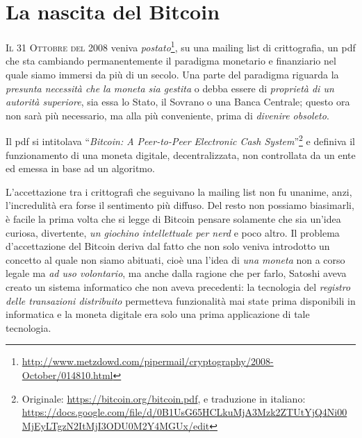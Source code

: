 \documentclass[a4paper,12pt,italian]{article}
\begin{document}
\section*{La nascita del Bitcoin}



\lettrine{I}{l 31 Ottobre del 2008} veniva
\emph{postato}\footnote{\url{http://www.metzdowd.com/pipermail/cryptography/2008-October/014810.html}}, 
su una mailing list di crittografia, un pdf che sta cambiando permanentemente
 il paradigma monetario e finanziario nel quale siamo immersi da più di un secolo. Una parte del paradigma riguarda la \emph{presunta necessità che la moneta
 sia gestita} o debba essere di \emph{proprietà di un
autorità superiore}, sia essa lo Stato, il Sovrano o una Banca Centrale;
questo ora non sarà più necessario, ma alla più conveniente, prima di \emph{divenire obsoleto}.

\smallskip
Il pdf si intitolava “\emph{Bitcoin: A Peer-to-Peer Electronic Cash
System}”\footnote{Originale: \url{https://bitcoin.org/bitcoin.pdf}, e traduzione
in italiano: \url{https://docs.google.com/file/d/0B1UsG65HCLkuMjA3Mzk2ZTUtYjQ4Ni00MjEyLTgzN2ItMjI3ODU0M2Y4MGUx/edit}
} e definiva il funzionamento di una moneta digitale, decentralizzata, non controllata
da un ente ed emessa in base ad un algoritmo.

\smallskip

L’accettazione tra i crittografi che seguivano la mailing list non fu
unanime, anzi, l’incredulità era forse il sentimento più diffuso. Del
resto non possiamo biasimarli, è facile la prima volta che si legge di
Bitcoin pensare solamente che sia un’idea curiosa, divertente, \emph{un
giochino intellettuale per nerd} e poco altro. Il problema
d’accettazione del Bitcoin deriva dal fatto che non solo veniva
introdotto un concetto al quale non siamo abituati, cioè una l’idea di
\emph{una moneta} non a corso legale ma \emph{ad uso volontario}, ma anche dalla
ragione che per farlo, Satoshi aveva creato un sistema informatico che
non aveva precedenti: la tecnologia del \emph{registro delle transazioni
distribuito} permetteva funzionalità mai state prima disponibili in
informatica e la moneta digitale era solo una prima applicazione di
tale tecnologia.
\end{document}
